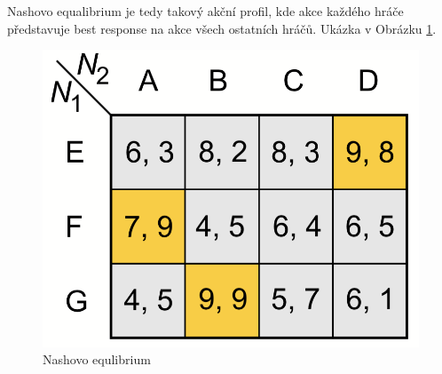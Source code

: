 \documentclass{article}
\begin{document}
Nashovo equalibrium je tedy takový akční profil, kde akce každého hráče představuje best response na akce všech ostatních hráčů. Ukázka v Obrázku \ref{fig:nash}.

\begin{figure}[h]
\begin{center}
\includegraphics[scale=0.6]{Nash}
\caption{Nashovo equlibrium}
\label{fig:nash}
\end{center}
\end{figure}
\end{document}
